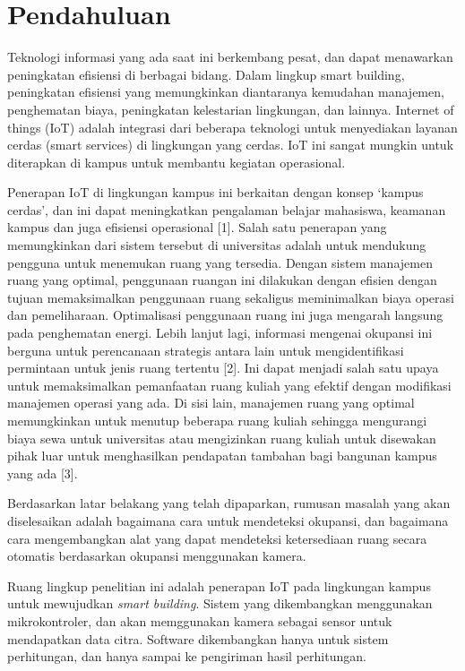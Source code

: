 \section{Pendahuluan}
\label{sec:pendahuluan}


Teknologi informasi yang ada saat ini berkembang pesat, dan dapat menawarkan peningkatan efisiensi di berbagai bidang. Dalam lingkup smart building, peningkatan efisiensi yang memungkinkan diantaranya kemudahan manajemen, penghematan biaya, peningkatan kelestarian lingkungan, dan lainnya. Internet of things (IoT) adalah integrasi dari beberapa teknologi untuk menyediakan layanan cerdas (smart services) di lingkungan yang cerdas. 
IoT ini sangat mungkin untuk diterapkan di kampus untuk membantu kegiatan operasional.


Penerapan IoT di lingkungan kampus ini berkaitan dengan konsep ‘kampus cerdas’, dan ini dapat meningkatkan pengalaman belajar mahasiswa, keamanan kampus dan juga efisiensi operasional [1]. 
Salah satu penerapan yang memungkinkan dari sistem tersebut di universitas adalah untuk mendukung pengguna untuk menemukan ruang yang tersedia. Dengan sistem manajemen ruang yang optimal, penggunaan ruangan ini dilakukan dengan efisien dengan tujuan memaksimalkan penggunaan ruang sekaligus meminimalkan biaya operasi dan pemeliharaan. Optimalisasi penggunaan ruang ini juga mengarah langsung pada penghematan energi. Lebih lanjut lagi, informasi mengenai okupansi ini berguna untuk perencanaan strategis antara lain untuk mengidentifikasi permintaan untuk jenis ruang tertentu [2]. Ini dapat menjadi salah satu upaya untuk memaksimalkan pemanfaatan ruang kuliah yang efektif dengan modifikasi manajemen operasi yang ada. Di sisi lain, manajemen ruang yang optimal memungkinkan untuk menutup beberapa ruang kuliah sehingga mengurangi biaya sewa untuk universitas atau mengizinkan ruang kuliah untuk disewakan pihak luar untuk menghasilkan pendapatan tambahan bagi bangunan kampus yang ada [3]. 


Berdasarkan latar belakang yang telah dipaparkan, rumusan masalah yang akan diselesaikan adalah bagaimana cara untuk mendeteksi okupansi, dan
bagaimana cara mengembangkan alat yang dapat mendeteksi ketersediaan ruang secara otomatis berdasarkan okupansi menggunakan kamera.


Ruang lingkup penelitian ini adalah penerapan IoT pada lingkungan kampus untuk mewujudkan {\it smart building}. Sistem yang dikembangkan menggunakan mikrokontroler, dan akan memggunakan kamera sebagai sensor untuk mendapatkan data citra.
Software dikembangkan hanya untuk sistem perhitungan, dan hanya sampai ke pengiriman hasil perhitungan.


